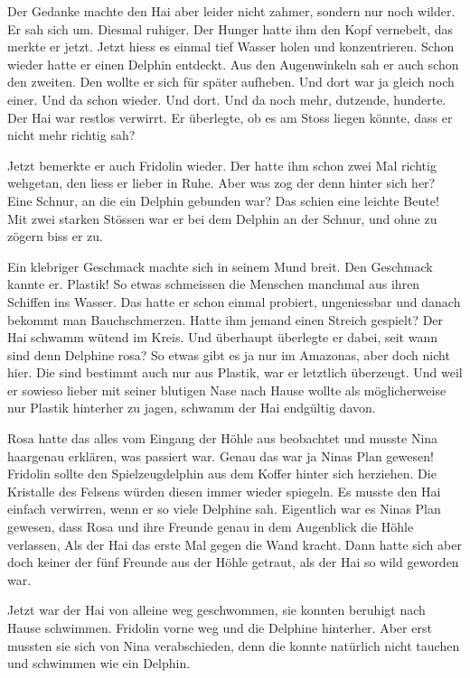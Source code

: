 Der Gedanke machte den Hai aber leider nicht zahmer, sondern nur noch wilder. Er sah sich um. Diesmal ruhiger. Der Hunger hatte ihm den Kopf vernebelt, das merkte er jetzt. Jetzt hiess es einmal tief Wasser holen und konzentrieren. Schon wieder hatte er einen Delphin entdeckt. Aus den Augenwinkeln sah er auch schon den zweiten. Den wollte er sich für später aufheben. Und dort war ja gleich noch einer. Und da schon wieder. Und dort. Und da noch mehr, dutzende, hunderte. Der Hai war restlos verwirrt. Er überlegte, ob es am Stoss liegen könnte, dass er nicht mehr richtig sah?

Jetzt bemerkte er auch Fridolin wieder. Der hatte ihm schon zwei Mal richtig wehgetan, den liess er lieber in Ruhe. Aber was zog der denn hinter sich her? Eine Schnur, an die ein Delphin gebunden war? Das schien eine leichte Beute! Mit zwei starken Stössen war er bei dem Delphin an der Schnur, und ohne zu zögern biss er zu.

Ein klebriger Geschmack machte sich in seinem Mund breit. Den Geschmack kannte er. Plastik! So etwas schmeissen die Menschen manchmal aus ihren Schiffen ins Wasser. Das hatte er schon einmal probiert, ungeniessbar und danach bekommt man Bauchschmerzen. Hatte ihm jemand einen Streich gespielt? Der Hai schwamm wütend im Kreis. Und überhaupt überlegte er dabei, seit wann sind denn Delphine rosa? So etwas gibt es ja nur im Amazonas, aber doch nicht hier. Die sind bestimmt auch nur aus Plastik, war er letztlich überzeugt.  Und weil er sowieso lieber mit seiner blutigen Nase nach Hause wollte als möglicherweise nur Plastik hinterher zu jagen, schwamm der Hai endgültig davon.

Rosa hatte das alles vom Eingang der Höhle aus beobachtet und musste Nina haargenau erklären, was passiert war. Genau das war ja Ninas Plan gewesen! Fridolin sollte den Spielzeugdelphin aus dem Koffer hinter sich herziehen. Die Kristalle des Felsens würden diesen immer wieder spiegeln. Es musste den Hai einfach verwirren, wenn er so viele Delphine sah. Eigentlich war es Ninas Plan gewesen, dass Rosa und ihre Freunde genau in dem Augenblick die Höhle verlassen, Als der Hai das erste Mal gegen die Wand kracht. Dann hatte sich aber doch keiner der fünf Freunde aus der Höhle getraut, als der Hai so wild geworden war.

Jetzt war der Hai von alleine weg geschwommen, sie konnten beruhigt nach Hause schwimmen. Fridolin vorne weg und die Delphine hinterher. Aber erst mussten sie sich von Nina verabschieden, denn die konnte natürlich nicht tauchen und schwimmen wie ein Delphin. 

